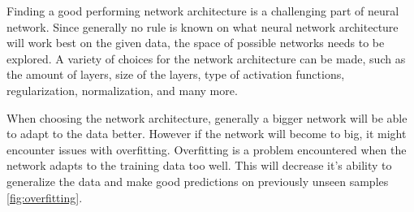 

Finding a good performing network architecture is a challenging part of neural network.
Since generally no rule is known on what neural network architecture will work best on the given data, the space of possible networks needs to be explored.
A variety of choices for the network architecture can be made, such as the amount of layers, size of the layers, type of activation functions, regularization, normalization, and many more.

When choosing the network architecture, generally a bigger network will be able to adapt to the data better.
However if the network will become to big, it might encounter issues with overfitting.
Overfitting is a problem encountered when the network adapts to the training data too well.
This will decrease it's ability to generalize the data and make good predictions on previously unseen samples \ref{fig:overfitting}.

